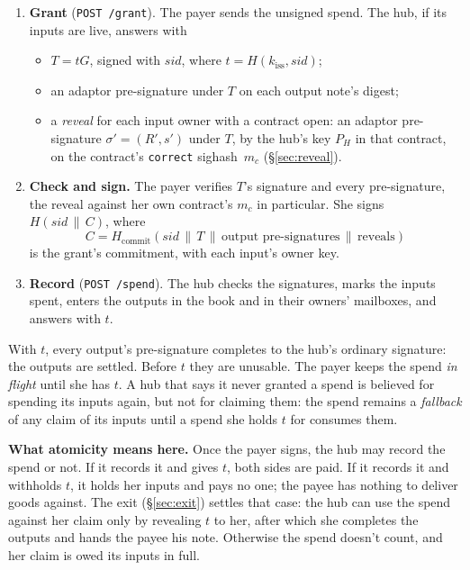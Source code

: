 \documentclass[11pt]{article}
\newcommand{\tx}[1]{\texttt{#1}}
\begin{document}
\begin{enumerate}[nosep]
\item \textbf{Grant} (\tx{POST /grant}). The payer sends the unsigned
  spend. The hub, if its inputs are live, answers with
  \begin{itemize}[nosep]
  \item $T = tG$, signed with $\mathit{sid}$, where
    $t = H(k_{\text{iss}}, \mathit{sid})$;
  \item an adaptor pre-signature under $T$ on each output note's digest;
  \item a \emph{reveal} for each input owner with a contract open: an
    adaptor pre-signature $\sigma' = (R', s')$ under $T$, by the hub's
    key $P_H$ in that contract, on the contract's \tx{correct}
    sighash~$m_c$ (\S\ref{sec:reveal}).
  \end{itemize}
\item \textbf{Check and sign.} The payer verifies $T$'s signature and
  every pre-signature, the reveal against her own contract's $m_c$ in
  particular. She signs $H(\mathit{sid} \,\|\, C)$, where
  \[
    C = H_{\text{commit}}(\mathit{sid} \,\|\, T \,\|\, \text{output
    pre-signatures} \,\|\, \text{reveals})
  \]
  is the grant's commitment, with each input's owner key.
\item \textbf{Record} (\tx{POST /spend}). The hub checks the signatures,
  marks the inputs spent, enters the outputs in the book and in their
  owners' mailboxes, and answers with $t$.
\end{enumerate}

With $t$, every output's pre-signature completes to the hub's ordinary
signature: the outputs are settled. Before $t$ they are unusable. The
payer keeps the spend \emph{in flight} until she has $t$. A hub that
says it never granted a spend is believed for spending its inputs again,
but not for claiming them: the spend remains a \emph{fallback} of any
claim of its inputs until a spend she holds $t$ for consumes them.

\textbf{What atomicity means here.} Once the payer signs, the hub may
record the spend or not. If it records it and gives $t$, both sides are
paid. If it records it and withholds $t$, it holds her inputs and pays
no one; the payee has nothing to deliver goods against. The exit
(\S\ref{sec:exit}) settles that case: the hub can use the spend against
her claim only by revealing $t$ to her, after which she completes the
outputs and hands the payee his note. Otherwise the spend doesn't count,
and her claim is owed its inputs in full.
\end{document}
